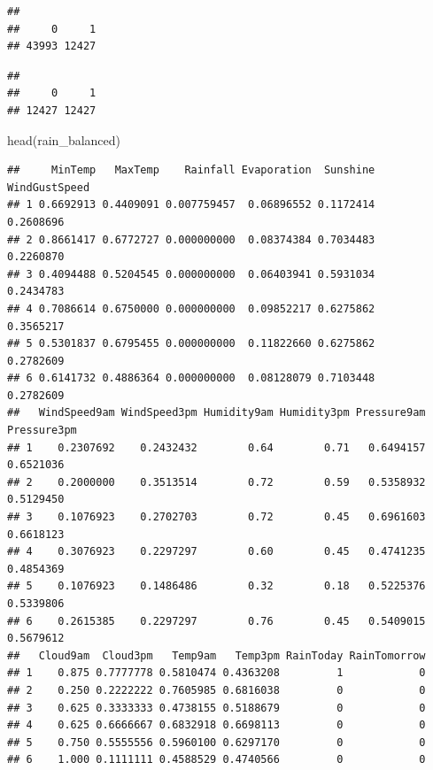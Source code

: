 \documentclass[
]{article}
\newenvironment{Shaded}{\begin{snugshade}}{\end{snugshade}}
\newcommand{\AttributeTok}[1]{\textcolor[rgb]{0.77,0.63,0.00}{#1}}
\newcommand{\CommentTok}[1]{\textcolor[rgb]{0.56,0.35,0.01}{\textit{#1}}}
\newcommand{\FunctionTok}[1]{\textcolor[rgb]{0.00,0.00,0.00}{#1}}
\newcommand{\NormalTok}[1]{#1}
\newcommand{\OtherTok}[1]{\textcolor[rgb]{0.56,0.35,0.01}{#1}}
\newcommand{\SpecialCharTok}[1]{\textcolor[rgb]{0.00,0.00,0.00}{#1}}
\newcommand{\StringTok}[1]{\textcolor[rgb]{0.31,0.60,0.02}{#1}}
\begin{document}
\begin{verbatim}
## 
##     0     1 
## 43993 12427
\end{verbatim}

\begin{Shaded}
\end{Shaded}

\begin{verbatim}
## 
##     0     1 
## 12427 12427
\end{verbatim}

\begin{Shaded}
\begin{Highlighting}[]
\FunctionTok{head}\NormalTok{(rain\_balanced)}
\end{Highlighting}
\end{Shaded}

\begin{verbatim}
##     MinTemp   MaxTemp    Rainfall Evaporation  Sunshine WindGustSpeed
## 1 0.6692913 0.4409091 0.007759457  0.06896552 0.1172414     0.2608696
## 2 0.8661417 0.6772727 0.000000000  0.08374384 0.7034483     0.2260870
## 3 0.4094488 0.5204545 0.000000000  0.06403941 0.5931034     0.2434783
## 4 0.7086614 0.6750000 0.000000000  0.09852217 0.6275862     0.3565217
## 5 0.5301837 0.6795455 0.000000000  0.11822660 0.6275862     0.2782609
## 6 0.6141732 0.4886364 0.000000000  0.08128079 0.7103448     0.2782609
##   WindSpeed9am WindSpeed3pm Humidity9am Humidity3pm Pressure9am Pressure3pm
## 1    0.2307692    0.2432432        0.64        0.71   0.6494157   0.6521036
## 2    0.2000000    0.3513514        0.72        0.59   0.5358932   0.5129450
## 3    0.1076923    0.2702703        0.72        0.45   0.6961603   0.6618123
## 4    0.3076923    0.2297297        0.60        0.45   0.4741235   0.4854369
## 5    0.1076923    0.1486486        0.32        0.18   0.5225376   0.5339806
## 6    0.2615385    0.2297297        0.76        0.45   0.5409015   0.5679612
##   Cloud9am  Cloud3pm   Temp9am   Temp3pm RainToday RainTomorrow
## 1    0.875 0.7777778 0.5810474 0.4363208         1            0
## 2    0.250 0.2222222 0.7605985 0.6816038         0            0
## 3    0.625 0.3333333 0.4738155 0.5188679         0            0
## 4    0.625 0.6666667 0.6832918 0.6698113         0            0
## 5    0.750 0.5555556 0.5960100 0.6297170         0            0
## 6    1.000 0.1111111 0.4588529 0.4740566         0            0
\end{verbatim}
\end{document}
